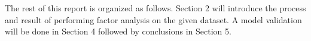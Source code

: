 \documentclass[10pt, conference]{IEEEtran}
\begin{document}
The rest of this report is organized as follows. Section 2 will introduce the process and result of performing factor analysis on the given dataset. A model validation will be done in Section 4 followed by conclusions in Section 5.  


%
%



%
%
\end{document}
